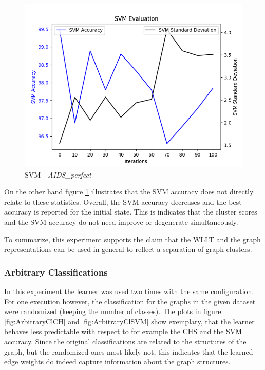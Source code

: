 		\begin{figure}[H]
			\centering
			\includegraphics[width=0.7\linewidth]{images/plotA0_SVM_AIDSPerfect_E_GDL_09_22h-03m}
			\caption{SVM - \textit{AIDS\_perfect}}
			\label{fig:plota0svmaidsperfectegdl0922h-03m}
		\end{figure}		
	
		On the other hand figure \ref{fig:plota0svmaidsperfectegdl0922h-03m} illustrates that the SVM accuracy does not directly relate to these statistics.
		Overall, the SVM accuracy decreases and the best accuracy is reported for the initial state.
		This is indicates that the cluster scores and the SVM accuracy do not need improve or degenerate simultaneously.
		
		To summarize, this experiment supports the claim that the WLLT and the graph representations can be used in general to reflect a separation of graph clusters. 
		 	
	
	
	\subsubsection{Arbitrary Classifications} \label{subsubsec:exp_Arbitrary_Classifications} %
		In this experiment the learner was used two times with the same configuration.
		For one execution however, the classification for the graphs in the given dataset were randomized (keeping the number of classes). 
		The plots in figure \ref{fig:ArbitraryClCH} and \ref{fig:ArbitraryClSVM} show exemplary, that the learner behaves less predictable with respect to for example the CHS and the SVM accuracy.		
		Since the original classifications are related to the structures of the graph, but the randomized ones most likely not, this indicates that the learned edge weights do indeed capture information about the graph structures.
		
